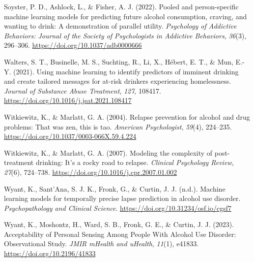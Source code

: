 \documentclass[
]{agujournal2019}
\newlength{\cslhangindent}
\newenvironment{CSLReferences}[2] %
 {\begin{list}{}{%
  \setlength{\itemindent}{0pt}
  \setlength{\leftmargin}{0pt}
  \setlength{\parsep}{0pt}
  \ifodd #1
   \setlength{\leftmargin}{\cslhangindent}
   \setlength{\itemindent}{-1\cslhangindent}
  \fi
  \setlength{\itemsep}{#2\baselineskip}}}
 {\end{list}}
\begin{document}
\begin{CSLReferences}{1}{0}
Soyster, P. D., Ashlock, L., \& Fisher, A. J. (2022). Pooled and
person-specific machine learning models for predicting future alcohol
consumption, craving, and wanting to drink: {A} demonstration of
parallel utility. \emph{Psychology of Addictive Behaviors: Journal of
the Society of Psychologists in Addictive Behaviors}, \emph{36}(3),
296--306. \url{https://doi.org/10.1037/adb0000666}

Walters, S. T., Businelle, M. S., Suchting, R., Li, X., Hébert, E. T.,
\& Mun, E.-Y. (2021). Using machine learning to identify predictors of
imminent drinking and create tailored messages for at-risk drinkers
experiencing homelessness. \emph{Journal of Substance Abuse Treatment},
\emph{127}, 108417. \url{https://doi.org/10.1016/j.jsat.2021.108417}

Witkiewitz, K., \& Marlatt, G. A. (2004). Relapse prevention for alcohol
and drug problems: {That} was zen, this is tao. \emph{American
Psychologist}, \emph{59}(4), 224--235.
\url{https://doi.org/10.1037/0003-066X.59.4.224}

Witkiewitz, K., \& Marlatt, G. A. (2007). Modeling the complexity of
post-treatment drinking: {It}'s a rocky road to relapse. \emph{Clinical
Psychology Review}, \emph{27}(6), 724--738.
\url{https://doi.org/10.1016/j.cpr.2007.01.002}

Wyant, K., Sant'Ana, S. J. K., Fronk, G., \& Curtin, J. J. (n.d.).
Machine learning models for temporally precise lapse prediction in
alcohol use disorder. \emph{Psychopathology and Clinical Science}.
\url{https://doi.org/10.31234/osf.io/cgsf7}

Wyant, K., Moshontz, H., Ward, S. B., Fronk, G. E., \& Curtin, J. J.
(2023). Acceptability of {Personal Sensing Among People With Alcohol Use
Disorder}: {Observational Study}. \emph{JMIR mHealth and uHealth},
\emph{11}(1), e41833. \url{https://doi.org/10.2196/41833}

\end{CSLReferences}
\end{document}
